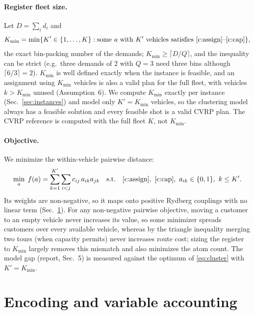 \documentclass[10pt]{article}
\begin{document}
\paragraph{Register fleet size.} Let $D=\sum_i d_i$ and
\[
  K_{\min}=\min\{K'\in\{1,\dots,K\} : \text{some } a \text{ with } K' \text{ vehicles satisfies \eqref{c:assign}--\eqref{c:cap}}\},
\]
the exact bin-packing number of the demands; $K_{\min}\ge\lceil D/Q\rceil$, and the inequality can be strict
(e.g.\ three demands of $2$ with $Q=3$ need three bins although $\lceil 6/3\rceil=2$). $K_{\min}$ is well defined
exactly when the instance is feasible, and an assignment using $K_{\min}$ vehicles is also a valid plan for
the full fleet, with vehicles $k>K_{\min}$ unused (Assumption~6). We compute $K_{\min}$ exactly per instance
(Sec.~\ref{sec:instances}) and model only $K'=K_{\min}$ vehicles, so the clustering model always has a feasible
solution and every feasible shot is a valid CVRP plan. The CVRP reference is computed with the full fleet $K$,
not $K_{\min}$.

\paragraph{Objective.} We minimize the within-vehicle pairwise distance:
\begin{equation}
  \min_{a}\; f(a)=\sum_{k=1}^{K'}\sum_{i<j} c_{ij}\,a_{ik}a_{jk}
  \quad \text{s.t.} \quad \eqref{c:assign},\ \eqref{c:cap},\ a_{ik} \in \{0,1\},\ k\le K'.
  \label{eq:cluster}
\end{equation}
Its weights are non-negative, so it maps onto positive Rydberg couplings with no linear term
(Sec.~\ref{sec:encoding}). For any non-negative pairwise objective, moving a customer to an empty vehicle never
increases its value, so some minimizer spreads customers over every available vehicle, whereas by the triangle inequality merging two tours (when capacity permits) never increases
route cost; sizing the register to $K_{\min}$ largely removes this mismatch and also minimizes the atom count.
The model gap (report, Sec.~5) is measured against the optimum of \eqref{eq:cluster} with $K'=K_{\min}$.

\section{Encoding and variable accounting}
\label{sec:encoding}
\end{document}
